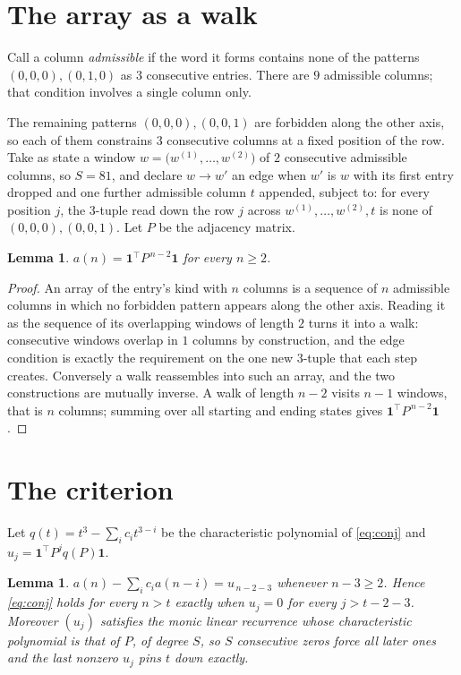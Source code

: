 \documentclass[11pt,a4paper]{article}
\theoremstyle{plain}
\newtheorem{lemma}[theorem]{Lemma}
\theoremstyle{definition}
\begin{document}
\section{The array as a walk}

Call a column \emph{admissible} if the word it forms contains none of the patterns
$(0,0,0), (0,1,0)$ as $3$ consecutive entries. There are $9$ admissible columns; that condition
involves a single column only.

The remaining patterns $(0,0,0), (0,0,1)$ are forbidden along the other axis, so each of them
constrains $3$ consecutive columns at a fixed position of the row. Take as state a
window $w=\bigl(w^{(1)},\dots,w^{(2)}\bigr)$ of $2$ consecutive admissible
columns, so $S=81$, and declare $w\to w'$ an edge when $w'$ is $w$ with its first entry
dropped and one further admissible column $t$ appended, subject to: for every position
$j$, the $3$-tuple read down the row $j$ across $w^{(1)},\dots,w^{(2)},t$
is none of $(0,0,0), (0,0,1)$. Let $P$ be the adjacency matrix.

\begin{lemma}\label{lem:walk}
$a(n)=\mathbf{1}^{\!\top}P^{\,n-2}\mathbf{1}$ for every $n\ge2$.
\end{lemma}

\begin{proof}
An array of the entry's kind with $n$ columns is a sequence of $n$ admissible columns in
which no forbidden pattern appears along the other axis. Reading it as the sequence of its
overlapping windows of length $2$ turns it into a walk: consecutive windows overlap in
$1$ columns by construction, and the edge condition is exactly the requirement on the one
new $3$-tuple that each step creates. Conversely a walk reassembles into such an array,
and the two constructions are mutually inverse. A walk of length $n-2$ visits $n-1$
windows, that is $n$ columns; summing over all starting and ending states gives
$\mathbf{1}^{\!\top}P^{\,n-2}\mathbf{1}$.
\end{proof}

\section{The criterion}

Let $q(t)=t^{3}-\sum_i c_i t^{3-i}$ be the characteristic polynomial of
\eqref{eq:conj} and $u_j=\mathbf{1}^{\!\top}P^{j}q(P)\mathbf{1}$.

\begin{lemma}\label{lem:crit}
$a(n)-\sum_i c_i a(n-i)=u_{\,n-2-3}$ whenever $n-3\ge2$. Hence
\eqref{eq:conj} holds for every $n>t$ exactly when $u_j=0$ for every
$j>t-2-3$. Moreover $(u_j)$ satisfies the monic linear recurrence whose
characteristic polynomial is that of $P$, of degree $S$, so $S$ consecutive zeros force all
later ones and the last nonzero $u_j$ pins $t$ down exactly.
\end{lemma}
\end{document}
